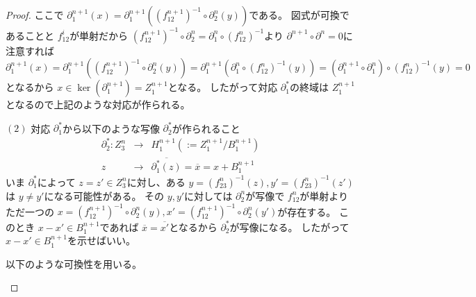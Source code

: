 \documentclass[../master_galois_theory]{subfiles}
\begin{document}
\begin{proof}
  ここで $\partial^{n+1}_1(x) = \partial^{n+1}_1((f_{12}^{n+1})^{-1} \circ \partial^n_2(y))$である。
  図式が可換であることと $f_{12}^i$が単射だから $(f_{12}^{n+1})^{-1} \circ \partial^n_2 = \partial^n_1 \circ (f_{12}^n)^{-1}$より
  $\partial^{n+1} \circ \partial^n = 0$に注意すれば
  $\partial^{n+1}_1(x) = \partial^{n+1}_1((f_{12}^{n+1})^{-1} \circ \partial^n_2(y)) = \partial^{n+1}_1(\partial^n_1 \circ (f_{12}^n)^{-1}(y)) = (\partial^{n+1}_1 \circ \partial^n_1) \circ (f_{12}^n)^{-1}(y) = 0$
  となるから $x \in \ker(\partial^{n+1}_1) = Z^{n+1}_1$となる。
  したがって対応 $\partial^*_1$の終域は $Z^{n+1}_1$となるので上記のような対応が作られる。

  $(2)$
  対応 $\partial^*_1$から以下のような写像 $\partial^*_2$が作られること
  \begin{eqnarray*}
    \partial^*_2 : Z^n_3 & \longrightarrow & H^{n+1}_1 (:= Z^{n+1}_1 / B^{n+1}_1) \\
    z & \longrightarrow & \overline{\partial^*_1(z)} = \overline{x} = x + B^{n+1}_1
  \end{eqnarray*}
  いま $\partial^*_1$によって $z = z' \in Z^n_3$に対し、ある $y = (f_{23}^n)^{-1}(z) , y' = (f_{23}^n)^{-1}(z')$は $y \neq y'$になる可能性がある。
  その $y , y'$に対しては $\partial^n_2$が写像で $f_{12}^n$が単射より
  ただ一つの $x = (f_{12}^{n+1})^{-1} \circ \partial^n_2(y) , x' = (f_{12}^{n+1})^{-1} \circ \partial^n_2(y')$が存在する。
  このとき $x - x' \in B^{n+1}_1$であれば $\overline{x} = \overline{x'}$となるから $\partial^*_2$が写像になる。
  したがって $x - x' \in B^{n+1}_1$を示せばいい。

  以下のような可換性を用いる。
  \begin{center}
  \end{center}


\end{proof}
\end{document}
